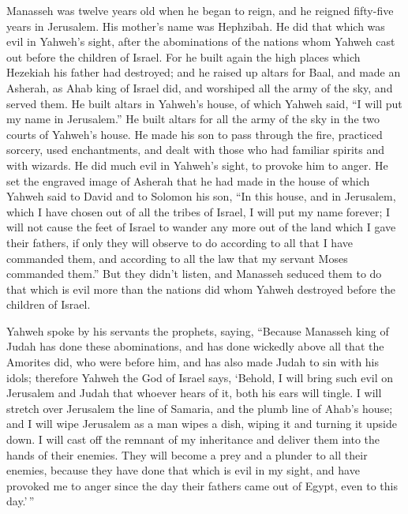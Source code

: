  Manasseh was twelve years old when he began to reign, and
he reigned fifty-five years in Jerusalem. His mother's name was
Hephzibah.  He did that which was evil in Yahweh's sight,
after the abominations of the nations whom Yahweh cast out before the
children of Israel.  For he built again the high places
which Hezekiah his father had destroyed; and he raised up altars for
Baal, and made an Asherah, as Ahab king of Israel did, and worshiped all
the army of the sky, and served them.  He built altars in
Yahweh's house, of which Yahweh said, ``I will put my name in
Jerusalem.''  He built altars for all the army of the sky in
the two courts of Yahweh's house.  He made his son to pass
through the fire, practiced sorcery, used enchantments, and dealt with
those who had familiar spirits and with wizards. He did much evil in
Yahweh's sight, to provoke him to anger.  He set the
engraved image of Asherah that he had made in the house of which Yahweh
said to David and to Solomon his son, ``In this house, and in Jerusalem,
which I have chosen out of all the tribes of Israel, I will put my name
forever;  I will not cause the feet of Israel to wander any
more out of the land which I gave their fathers, if only they will
observe to do according to all that I have commanded them, and according
to all the law that my servant Moses commanded them.''  But
they didn't listen, and Manasseh seduced them to do that which is evil
more than the nations did whom Yahweh destroyed before the children of
Israel.

 Yahweh spoke by his servants the prophets, saying,
 ``Because Manasseh king of Judah has done these
abominations, and has done wickedly above all that the Amorites did, who
were before him, and has also made Judah to sin with his idols;
 therefore Yahweh the God of Israel says, `Behold, I will
bring such evil on Jerusalem and Judah that whoever hears of it, both
his ears will tingle.  I will stretch over Jerusalem the
line of Samaria, and the plumb line of Ahab's house; and I will wipe
Jerusalem as a man wipes a dish, wiping it and turning it upside down.
 I will cast off the remnant of my inheritance and deliver
them into the hands of their enemies. They will become a prey and a
plunder to all their enemies,  because they have done that
which is evil in my sight, and have provoked me to anger since the day
their fathers came out of Egypt, even to this day.'\,''

